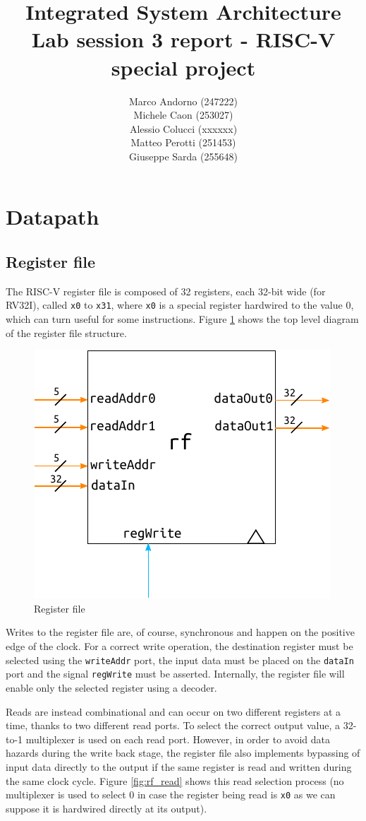 \documentclass[a4paper]{article}
\title{Integrated System Architecture \\ Lab session 3 report - RISC-V special project}
\author{Marco Andorno (247222)\\ Michele Caon (253027) \\ Alessio Colucci (xxxxxx) \\ Matteo Perotti (251453) \\ Giuseppe Sarda (255648)}
\begin{document}
\maketitle

\section{Datapath}
\subsection{Register file}
The RISC-V register file is composed of 32 registers, each 32-bit wide (for RV32I), called \texttt{x0} to \texttt{x31}, where \texttt{x0} is a special register hardwired to the value 0, which can turn useful for some instructions. Figure \ref{fig:rf} shows the top level diagram of the register file structure.

\begin{figure}[hbtp]
    \centering
    \includegraphics[scale=1]{../register_file/ref/schematic/register_file.pdf}
    \caption{Register file}
    \label{fig:rf}
\end{figure}

Writes to the register file are, of course, synchronous and happen on the positive edge of the clock. For a correct write operation, the destination register must be selected using the \texttt{writeAddr} port, the input data must be placed on the \texttt{dataIn} port and the signal \texttt{regWrite} must be asserted. Internally, the register file will enable only the selected register using a decoder.

Reads are instead combinational and can occur on two different registers at a time, thanks to two different read ports. To select the correct output value, a 32-to-1 multiplexer is used on each read port. However, in order to avoid data hazards during the write back stage, the register file also implements bypassing of input data directly to the output if the same register is read and written during the same clock cycle. Figure \ref{fig:rf_read} shows this read selection process (no multiplexer is used to select 0 in case the register being read is \texttt{x0} as we can suppose it is hardwired directly at its output).
\end{document}
